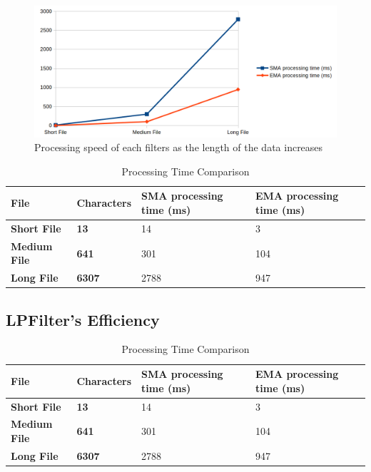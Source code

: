 \begin{figure}[!h]
	\begin{center}
		\includegraphics[width=15cm]{images/GraphSpeedtoLength.png}
	\end{center}
	\caption{Processing speed of each filters as the length of the data increases}
\end{figure}

\begin{table}[!h]
	\centering
	\begin{tabularx}{\textwidth}{|X|X|X|X|}
		\hline
		\textbf{File} & \textbf{Characters} & \textbf{SMA processing time (ms)} & \textbf{EMA processing time (ms)} \\ \hline
		\textbf{Short File} & \textbf{13} & 14 & 3 \\ \hline
		\textbf{Medium File} & \textbf{641} & 301 & 104 \\ \hline
		\textbf{Long File} & \textbf{6307} & 2788 & 947 \\ \hline
	\end{tabularx}
	\caption{Processing Time Comparison}
\end{table}

\subsection{LPFilter's Efficiency}

\begin{table}[!h]
	\centering
	\begin{tabularx}{\textwidth}{|X|X|X|X|}
		\hline
		\textbf{File} & \textbf{Characters} & \textbf{SMA processing time (ms)} & \textbf{EMA processing time (ms)} \\ \hline
		\textbf{Short File} & \textbf{13} & 14 & 3 \\ \hline
		\textbf{Medium File} & \textbf{641} & 301 & 104 \\ \hline
		\textbf{Long File} & \textbf{6307} & 2788 & 947 \\ \hline
	\end{tabularx}
	\caption{Processing Time Comparison}
\end{table}

